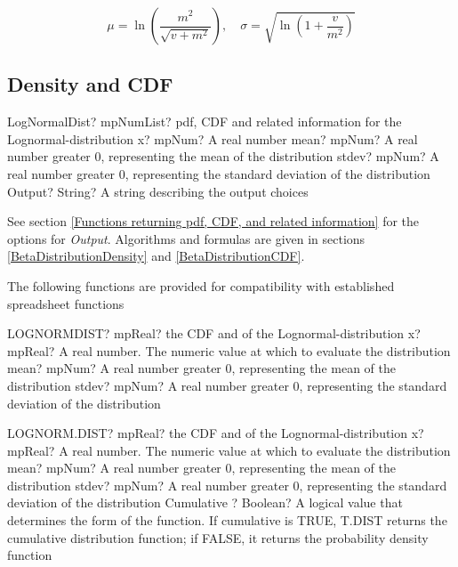 \begin{equation}
	\mu = \ln \left(\frac{m^2}{\sqrt{v+m^2}}\right), \quad \sigma = \sqrt{\ln\left(1+\frac{v}{m^2} \right)}
\end{equation}


\subsection{Density and CDF}

\begin{mpFunctionsExtract}
	\mpFunctionFourNotImplemented
	{LogNormalDist? mpNumList? pdf, CDF and related information for the Lognormal-distribution}
	{x? mpNum? A real number}
	{mean? mpNum? A real number greater 0, representing the mean of the distribution}
	{stdev? mpNum? A real number greater 0, representing the standard deviation of the distribution}
	{Output? String? A string describing the output choices}
\end{mpFunctionsExtract}


\vspace{0.3cm}
See section \ref{Functions returning pdf, CDF, and related information} for the options for {\itshape\sffamily Output}. Algorithms and formulas are given in sections \ref{BetaDistributionDensity} and \ref{BetaDistributionCDF}.


\vspace{0.3cm}

The following functions are provided for compatibility with established spreadsheet functions

\vspace{0.3cm}
\begin{mpFunctionsExtract}
	\mpWorksheetFunctionThreeNotImplemented
	{LOGNORMDIST? mpReal? the CDF and of the Lognormal-distribution}
	{x? mpReal? A real number. The numeric value at which to evaluate the distribution}
	{mean? mpNum? A real number greater 0, representing the mean of the distribution}
	{stdev? mpNum? A real number greater 0, representing the standard deviation of the distribution}
\end{mpFunctionsExtract}

\vspace{0.6cm}
\begin{mpFunctionsExtract}
	\mpWorksheetFunctionFourNotImplemented
	{LOGNORM.DIST? mpReal? the CDF and of the Lognormal-distribution}
	{x? mpReal? A real number. The numeric value at which to evaluate the distribution}
	{mean? mpNum? A real number greater 0, representing the mean of the distribution}
	{stdev? mpNum? A real number greater 0, representing the standard deviation of the distribution}
	{Cumulative ? Boolean? A logical value that determines the form of the function. If cumulative is TRUE, T.DIST returns the cumulative distribution function; if FALSE, it returns the probability density function}
\end{mpFunctionsExtract}




